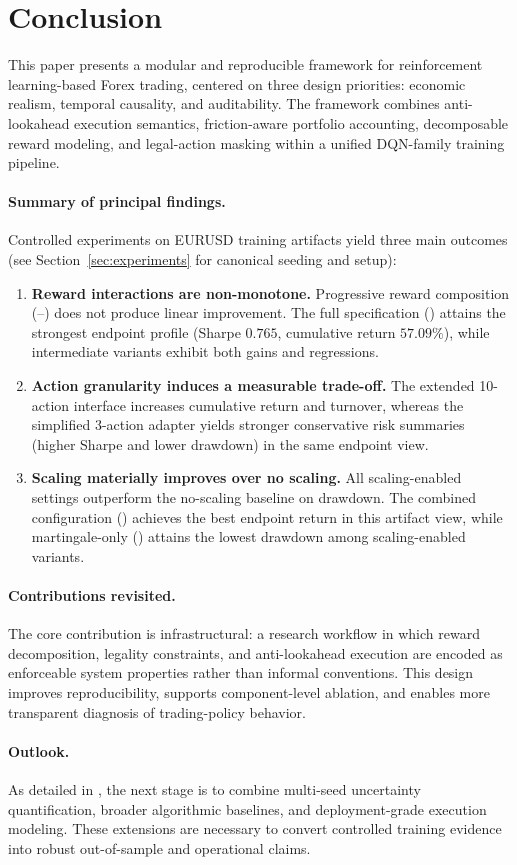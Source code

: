 \section{Conclusion}
\label{sec:conclusion}

This paper presents a modular and reproducible framework for reinforcement learning-based Forex trading, centered on three design priorities: economic realism, temporal causality, and auditability. The framework combines anti-lookahead execution semantics, friction-aware portfolio accounting, decomposable reward modeling, and legal-action masking within a unified DQN-family training pipeline.

\paragraph{Summary of principal findings.}
Controlled experiments on EURUSD training artifacts yield three main outcomes (see Section~\ref{sec:experiments} for canonical seeding and setup):
\begin{enumerate}[leftmargin=1.8em]
    \item \textbf{Reward interactions are non-monotone.} Progressive reward composition (--) does not produce linear improvement. The full specification () attains the strongest endpoint profile (Sharpe $0.765$, cumulative return $57.09\%$), while intermediate variants exhibit both gains and regressions.
    \item \textbf{Action granularity induces a measurable trade-off.} The extended 10-action interface increases cumulative return and turnover, whereas the simplified 3-action adapter yields stronger conservative risk summaries (higher Sharpe and lower drawdown) in the same endpoint view.
    \item \textbf{Scaling materially improves over no scaling.} All scaling-enabled settings outperform the no-scaling baseline on drawdown. The combined configuration () achieves the best endpoint return in this artifact view, while martingale-only () attains the lowest drawdown among scaling-enabled variants.
\end{enumerate}

\paragraph{Contributions revisited.}
The core contribution is infrastructural: a research workflow in which reward decomposition, legality constraints, and anti-lookahead execution are encoded as enforceable system properties rather than informal conventions. This design improves reproducibility, supports component-level ablation, and enables more transparent diagnosis of trading-policy behavior.

\paragraph{Outlook.}
As detailed in , the next stage is to combine multi-seed uncertainty quantification, broader algorithmic baselines, and deployment-grade execution modeling. These extensions are necessary to convert controlled training evidence into robust out-of-sample and operational claims.
